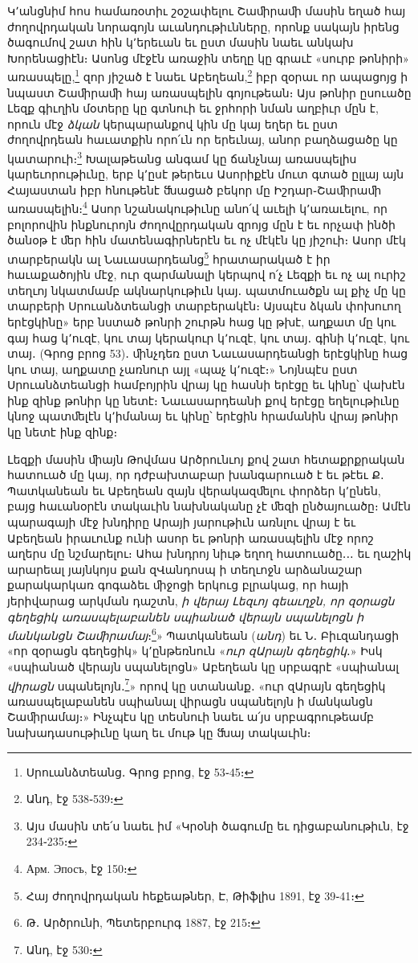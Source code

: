 \documentclass{article}
\begin{document}
{Կ՚անցնիմ հոս համառօտիւ շօշափելու Շաﬕրաﬕ մասին եղած հայ ժողովրդական նորագոյն աւանդութիւնները, որոնք սակայն իրենց ծագումով շատ հին կ՚երեւան եւ ըստ մասին նաեւ անկախ Խորենացիէն։ Ասոնց մէջէն առաջին տեղը կը գրաւէ «սուրբ թոնիրի» առասպելը,\footnote{Սրուանձտեանց․ Գրոց բրոց, էջ 53֊45։} զոր յիշած է նաեւ Աբեղեան,\footnote{Անդ, էջ 538֊539։} իբր զօրաւ որ ապացոյց ի նպաստ Շաﬕրաﬕ հայ առասպելին գոյութեան։ Այս թոնիր ըսուածը Լեզք գիւղին մօտերը կը գտնուի եւ ջրհորի նման աղբիւր մըն է, որուն մէջ \emph{ձկան} կերպարանքով կին մը կայ եղեր եւ ըստ ժողովրդեան հաւատքին որո՛ւն որ երեւնայ, անոր բաղձացածը կը կատարուի։\footnote{Այս մասին տե՛ս նաեւ իմ «Կրօնի ծագումը եւ դիցաբանութիւն, էջ 234֊235։} Խալաթեանց անգամ կը ճանչնայ առասպելիս կարեւորութիւնը, երբ կ՚ըսէ թերեւս Ասորիքէն մուտ գտած ըլլայ այն Հայաստան իբր հնութենէ ﬓացած բեկոր մը Իշդար֊Շաﬕրաﬕ առասպելին։\footnote{Арм. Эпосъ, էջ 150։} Ասոր նշանակութիւնը անո՛վ աւելի կ՚առաւելու, որ բոլորովին ինքնուրոյն ժողովըրդական զրոյց մըն է եւ որչափ ինծի ծանօթ է ﬔր հին մատենագիրներէն եւ ոչ մէկէն կը յիշուի։ Ասոր մէկ տարբերակն ալ Նաւասարդեանց\footnote{Հայ ժողովրդական հեքեաթներ, Է, Թիֆլիս 1891, էջ 39֊41։} հրատարակած է իր հաւաքածոյին մէջ, ուր զարմանալի կերպով ո՛չ Լեզքի եւ ոչ ալ ուրիշ տեղւոյ նկատմամբ ակնարկութիւն կայ․ պատմուածքն ալ քիչ մը կը տարբերի Սրուանձտեանցի տարբերակէն։ Այսպէս ձկան փոխուող երէցկինը» երբ նստած թոնրի շուրթն հաց կը թխէ, աղքատ մը կու գայ հաց կ՚ուզէ, կու տայ կերակուր կ՚ուզէ, կու տայ․ գինի կ՚ուզէ, կու տայ․ (Գրոց բրոց 53)․ ﬕնչդեռ ըստ Նաւասարդեանցի երէցկինը հաց կու տայ, աղքատը չառնուր այլ «պաչ կ՚ուզէ։» Նոյնպէս ըստ Սրուանձտեանցի համբոյրին վրայ կը հասնի երէցը եւ կինը՝ վախէն ինք զինք թոնիր կը նետէ։ Նաւասարդեանի քով երէցը եղելութիւնը կնոջ պատﬔլէն կ՚իմանայ եւ կինը՝ երէցին հրամանին վրայ թոնիր կը նետէ ինք զինք։

Լեզքի մասին ﬕայն Թովմաս Արծրունւոյ քով շատ հետաքրքրական հատուած մը կայ, որ դժբախտաբար խանգարուած է եւ թէեւ Ք․ Պատկանեան եւ Աբեղեան զայն վերակազﬔլու փորձեր կ՚ընեն, բայց հաւանօրէն տակաւին նախնականը չէ ﬔզի ընծայուածը։ Ամէն պարագայի մէջ խնդիրը Արայի յարութիւն առնլու վրայ է եւ Աբեղեան իրաւունք ունի ասոր եւ թոնրի առասպելին մէջ որոշ աղերս մը նշմարելու։ Ահա խնդրոյ նիւթ եղող հատուածը․․․ եւ ղաշիկ արարեալ յայնկոյս քան զՎանդոսպ ի տեղւոջն արձանաշար քարակարկառ գոգաձեւ ﬕջոցի երկուց բլրակաց, որ հայի յերիվարաց արկման դաշտն, \emph{ի վերայ Լեզւոյ գեաւղջն, որ զօրացն գեղեցիկ առասպելաբանեն սպիանած վերայն սպանելոցն ի մանկանցն Շաﬕրամայ}։\footnote{Թ․ Արծրունի, Պետերբուրգ 1887, էջ 215։}» Պատկանեան (\emph{անդ}) եւ Ն․ Բիւզանդացի «որ զօրացն գեղեցիկ» կ՚ընթեռնուն «\emph{ուր զԱրայն գեղեցիկ}․» Իսկ «սպիանած վերայն սպանելոցն» Աբեղեան կը սրբագրէ «սպիանալ \emph{վիրացն} սպանելոյն․\footnote{Անդ, էջ 530։}» որով կը ստանանք․ «ուր զԱրայն գեղեցիկ առասպելաբանեն սպիանալ վիրացն սպանելոյն ի մանկանցն Շաﬕրամայ։» Ինչպէս կը տեսնուի նաեւ ա՛յս սրբագրութեամբ նախադասութիւնը կաղ եւ մութ կը ﬓայ տակաւին։

}
\end{document}
